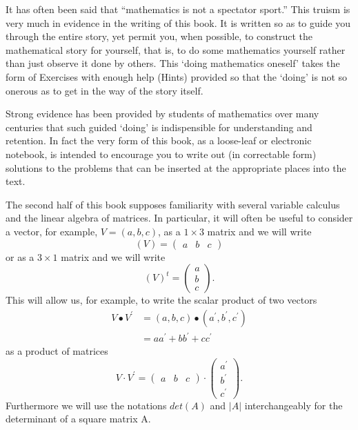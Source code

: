 \documentclass{ximera}
\begin{document}
It has often been said that ``mathematics is not a spectator sport.''
This truism is very much in evidence in the writing of this book. It
is written so as to guide you through the entire story, yet permit
you, when possible, to construct the mathematical story for yourself,
that is, to do some mathematics yourself rather than just observe it
done by others. This `doing mathematics oneself' takes the form of
Exercises with enough help (Hints) provided so that the `doing' is not
so onerous as to get in the way of the story itself.

Strong evidence has been provided by students of mathematics over many
centuries that such guided `doing' is indispensible for understanding and
retention. In fact the very form of this book, as a loose-leaf or electronic
notebook, is intended to encourage you to write out (in correctable form)
solutions to the problems that can be inserted at the appropriate places into
the text.

The second half of this book supposes familiarity with several variable
calculus and the linear algebra of matrices. In particular, it will often be
useful to consider a vector, for example, $V=\left( a,b,c\right) $, as a $%
1\times 3$ matrix and we will write%
\begin{equation*}
\left( V\right) =\left( 
\begin{array}{ccc}
a & b & c%
\end{array}%
\right) 
\end{equation*}%
or as a $3\times 1$ matrix and we will write%
\begin{equation*}
\left( V\right) ^{t}=\left( 
\begin{array}{c}
a \\ 
b \\ 
c%
\end{array}%
\right) .
\end{equation*}%
This will allow us, for example, to write the scalar product of two vectors%
\begin{align*}
V\bullet V^{\prime }& =\left( a,b,c\right) \bullet \left( a^{\prime
},b^{\prime },c^{\prime }\right)  \\
& =aa^{\prime }+bb^{\prime }+cc^{\prime }
\end{align*}%
as a product of matrices%
\begin{equation*}
V\cdot V^{\prime }=\left( 
\begin{array}{ccc}
a & b & c%
\end{array}%
\right) \cdot \left( 
\begin{array}{c}
a^{\prime } \\ 
b^{\prime } \\ 
c^{\prime }%
\end{array}%
\right) .
\end{equation*}%
Furthermore we will use the notations $det(A)$ and $|A|$ interchangeably for the determinant of a square matrix A.
\end{document}
